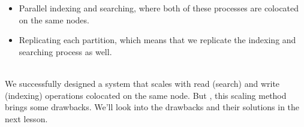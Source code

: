 \begin{itemize}
\item
\protect{}\label{3yxlMM18nODmDoV0n5qtj}
Parallel indexing and searching, where both of these processes are colocated on the same nodes.
\item
\protect{}\label{kfDvZI7JzPwR9efow69Ta}
Replicating each partition, which means that we replicate the indexing and searching process as well.
\end{itemize}
\\
We successfully designed a system that scales with read (search) and write (indexing) operations colocated on the same node. But , this scaling method brings some drawbacks. We'll look into the drawbacks and their solutions in the next lesson.

